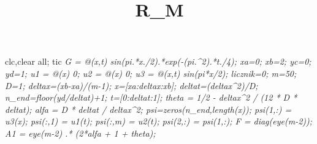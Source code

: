 \documentclass[]{article}
\title{R\_M}
\author{}
\date{}
\newenvironment{Shaded}{\begin{snugshade}}{\end{snugshade}}
\newcommand{\BaseNTok}[1]{\textcolor[rgb]{0.00,0.00,0.81}{#1}}
\newcommand{\FloatTok}[1]{\textcolor[rgb]{0.00,0.00,0.81}{#1}}
\newcommand{\CommentTok}[1]{\textcolor[rgb]{0.56,0.35,0.01}{\textit{#1}}}
\newcommand{\FunctionTok}[1]{\textcolor[rgb]{0.00,0.00,0.00}{#1}}
\newcommand{\NormalTok}[1]{#1}
\begin{document}
\maketitle

\begin{Shaded}
\begin{Highlighting}[]
\FunctionTok{clc}\NormalTok{,}\FunctionTok{clear} \FunctionTok{all}\NormalTok{; }\FunctionTok{tic}
\CommentTok{%rozwiązanie analityczne}
\NormalTok{G = @(x,t) }\FunctionTok{sin}\NormalTok{(}\BaseNTok{pi}\NormalTok{.*x./}\FloatTok{2}\NormalTok{).*}\FunctionTok{exp}\NormalTok{(-(}\BaseNTok{pi}\NormalTok{.^}\FloatTok{2}\NormalTok{).*t./}\FloatTok{4}\NormalTok{);}
\CommentTok{%przedział omega}
\NormalTok{xa=}\FloatTok{0}\NormalTok{; xb=}\FloatTok{2}\NormalTok{; yc=}\FloatTok{0}\NormalTok{; yd=}\FloatTok{1}\NormalTok{;}
\CommentTok{%warunki brzegowe}
\NormalTok{u1 = @(x) }\FloatTok{0}\NormalTok{;}
\NormalTok{u2 = @(x) }\FloatTok{0}\NormalTok{;}
\NormalTok{u3 = @(x,t) }\FunctionTok{sin}\NormalTok{(}\BaseNTok{pi}\NormalTok{*x/}\FloatTok{2}\NormalTok{);}
\NormalTok{licznik=}\FloatTok{0}\NormalTok{;}
\CommentTok{%siatka}
\NormalTok{m=}\FloatTok{50}\NormalTok{; D=}\FloatTok{1}\NormalTok{;}
\NormalTok{deltax=(xb-xa)/(m-}\FloatTok{1}\NormalTok{);}
\NormalTok{x=[xa:deltax:xb];         }\CommentTok{%przedział przestrzenny}
\NormalTok{deltat=(deltax^}\FloatTok{2}\NormalTok{)/D; n_end=}\FunctionTok{floor}\NormalTok{(yd/deltat)+}\FloatTok{1}\NormalTok{;}
\NormalTok{t=[}\FloatTok{0}\NormalTok{:deltat:}\FloatTok{1}\NormalTok{];           }\CommentTok{%przedział czasowy}
\NormalTok{theta = }\FloatTok{1}\NormalTok{/}\FloatTok{2}\NormalTok{ - deltax^}\FloatTok{2}\NormalTok{ / (}\FloatTok{12}\NormalTok{ * D * deltat);}
\NormalTok{alfa = D * deltat / deltax^}\FloatTok{2}\NormalTok{;}
\CommentTok{%macierz}
\FunctionTok{psi}\NormalTok{=}\FunctionTok{zeros}\NormalTok{(n_end,}\FunctionTok{length}\NormalTok{(x)); }\CommentTok{%utworzenie pustej macierzy}
\CommentTok{%dodanie warunku początkowego}
\FunctionTok{psi}\NormalTok{(}\FloatTok{1}\NormalTok{,:) = u3(x);}
\FunctionTok{psi}\NormalTok{(:,}\FloatTok{1}\NormalTok{) = u1(t);}
\FunctionTok{psi}\NormalTok{(:,m) = u2(t);}
\CommentTok{% Skopiowanie pierwszego kroku }
\FunctionTok{psi}\NormalTok{(}\FloatTok{2}\NormalTok{,:) = }\FunctionTok{psi}\NormalTok{(}\FloatTok{1}\NormalTok{,:);}
\NormalTok{F = }\FunctionTok{diag}\NormalTok{(}\FunctionTok{eye}\NormalTok{(m-}\FloatTok{2}\NormalTok{));}
\NormalTok{A1 = }\FunctionTok{eye}\NormalTok{(m-}\FloatTok{2}\NormalTok{) .* (}\FloatTok{2}\NormalTok{*alfa + }\FloatTok{1}\NormalTok{ + theta);}
}}}}}}}}}}
\end{Highlighting}
\end{Shaded}
\end{document}
